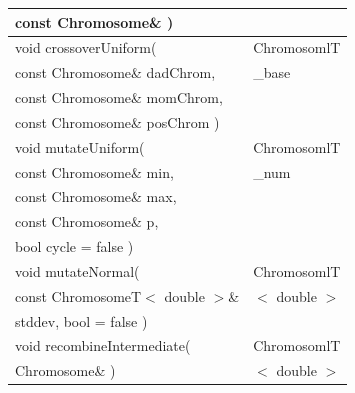 \documentclass[twocolumn]{article}
\begin{document}
\begin{table}[h]
\begin{center}
{\begin{tabular}{|l|l|}
\hspace*{2mm} const Chromosome\& )              &                             \\\hline      
void crossoverUniform(                          & ChromosomlT                 \\
\hspace*{2mm} const Chromosome\& dadChrom,      & \hspace{2mm} \_base         \\ 
\hspace*{2mm} const Chromosome\& momChrom,      &                             \\
\hspace*{2mm} const Chromosome\& posChrom )     &                             \\\hline
void mutateUniform(                             & ChromosomlT                 \\
\hspace*{2mm} const Chromosome\& min,           & \hspace{2mm} \_num          \\
\hspace*{2mm} const Chromosome\& max,           &                             \\
\hspace*{2mm} const Chromosome\& p,             &                             \\
\hspace*{2mm} bool cycle = false )              &                             \\\hline  
void mutateNormal(                              & ChromosomlT                 \\
\hspace*{2mm} const ChromosomeT$<$ double $>$\& & \hspace{2mm} $<$ double $>$ \\       
\hspace*{2mm} stddev, bool = false )            &                             \\\hline 
void recombineIntermediate(                     & ChromosomlT                 \\
\hspace*{2mm} Chromosome\& )                    & \hspace{2mm} $<$ double $>$ \\\hline
\end{tabular}
}
\end{center}
\end{table}
\end{document}
